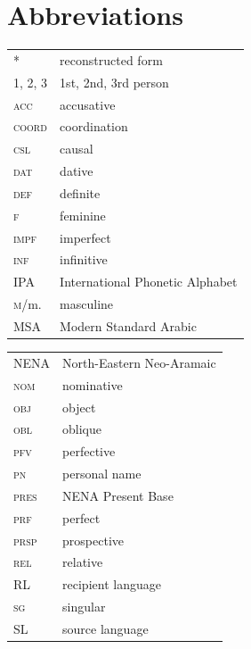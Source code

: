 \documentclass[output=paper]{langsci/langscibook}
\begin{document}
\section*{Abbreviations}

\begin{tabularx}{.5\textwidth}{@{}lQ@{}}
*  &  reconstructed form\\
\textsc{1, 2, 3} & 1st, 2nd, 3rd person \\
\textsc{acc} & accusative\\
\textsc{coord} & {coordination}\\
\textsc{csl} & causal \\
\textsc{dat} & dative\\
\textsc{def} & {definite}\\
\textsc{f} & feminine\\
\textsc{impf} & imperfect\\
\textsc{inf} & {infinitive}\\
IPA & International Phonetic Alphabet\\
\textsc{m}/m. & masculine\\
MSA & Modern Standard Arabic
\end{tabularx}%
\begin{tabularx}{.5\textwidth}{@{}lQ@{}}
NENA & North-Eastern Neo-Aramaic\\
\textsc{nom} & nominative\\
\textsc{obj} & object \\
\textsc{obl} & oblique \\
\textsc{pfv} & perfective\\
\textsc{pn} & personal name \\
\textsc{pres}    & NENA Present Base \\
\textsc{prf} & perfect\\
\textsc{prsp} & {prospective}\\
\textsc{rel} & {relative}\\
{RL} & {recipient language}\\
\textsc{sg} & singular\\
{SL} & {source language}\\
\end{tabularx}%



\sloppy
\printbibliography[heading=subbibliography,notkeyword=this]
\end{document}
